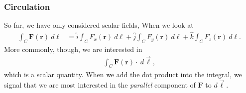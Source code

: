 \documentclass[10pt]{mypackage}
\begin{document}
\subsubsection{Circulation}%
So far, we have only considered scalar  fields, When we look at
\begin{align*}
  \int_{C}^{} \mathbf{F}\left(\mathbf{r}\right)\:d\ell &= \hat{i}\int_{C}^{} F_x\left(\mathbf{r}\right)\:d\ell + \hat{j}\int_{C}^{} F_y\left(\mathbf{r}\right)\:d\ell + \hat{k}\int_{C}^{} F_z\left(\mathbf{r}\right)\:d\ell.
\end{align*}
More commonly, though, we are interested in
\begin{align*}
  \int_{C}^{} \mathbf{F}\left(\mathbf{r}\right)\cdot\:d\vec{\ell},
\end{align*}
which is a scalar quantity. When we add the dot product into the integral, we signal that we are most interested in the \textit{parallel} component of $\mathbf{F}$ to $d\vec{\ell}$.\newline
\end{document}
